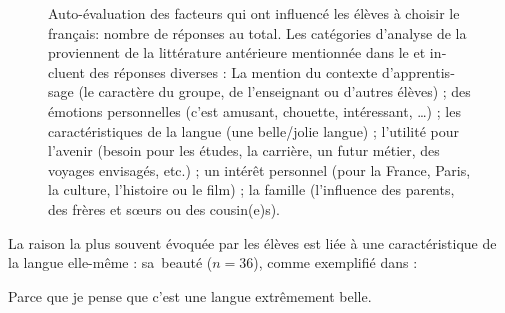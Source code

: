 \documentclass[french, output=paper]{langscibook}
\begin{document}
\begin{otherlanguage}{french}
  
\begin{figure}

\caption{\label{fig:granfeldt:4}Auto-évaluation des facteurs qui ont influencé les élèves à choisir le français: nombre de réponses au total. Les catégories d’analyse de la  proviennent de la littérature antérieure mentionnée dans le  et incluent des réponses diverses : La mention du contexte d’apprentissage (le caractère du groupe, de l’enseignant ou d’autres élèves) ; des émotions personnelles (c’est amusant, chouette, intéressant, …) ; les caractéristiques de la langue (une belle/jolie langue) ; l’utilité pour l’avenir (besoin pour les études, la carrière, un futur métier, des voyages envisagés, etc.) ; un intérêt personnel (pour la France, Paris, la culture, l’histoire ou le film) ; la famille (l’influence des parents, des frères et sœurs ou des cousin(e)s).}
\end{figure}

La raison la plus souvent évoquée par les élèves est liée à une caractéristique de la langue elle-même : sa~beauté ($n=36$), comme exemplifié dans  : 

\ea%
    \label{ex:granfeldt:1}
    Parce que je pense que c’est une langue extrêmement belle. 
\z


\end{otherlanguage}
\end{document}
